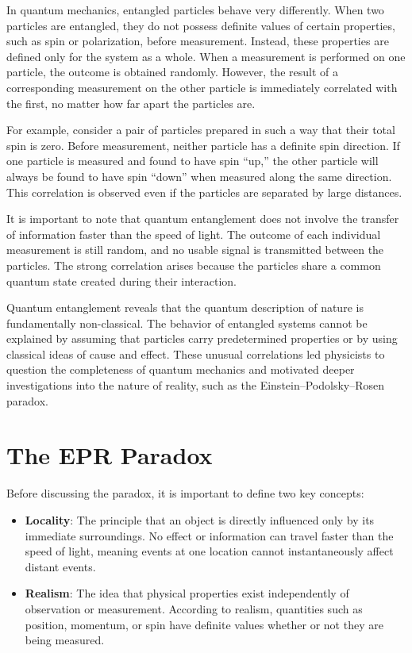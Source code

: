 \documentclass[14pt,a4paper]{extarticle}
\begin{document}
In quantum mechanics, entangled particles behave very differently. When two particles are entangled, they do not possess definite values of certain properties, such as spin or polarization, before measurement. Instead, these properties are defined only for the system as a whole. When a measurement is performed on one particle, the outcome is obtained randomly. However, the result of a corresponding measurement on the other particle is immediately correlated with the first, no matter how far apart the particles are.

For example, consider a pair of particles prepared in such a way that their total spin is zero. Before measurement, neither particle has a definite spin direction. If one particle is measured and found to have spin “up,” the other particle will always be found to have spin “down” when measured along the same direction. This correlation is observed even if the particles are separated by large distances.

It is important to note that quantum entanglement does not involve the transfer of information faster than the speed of light. The outcome of each individual measurement is still random, and no usable signal is transmitted between the particles. The strong correlation arises because the particles share a common quantum state created during their interaction.

Quantum entanglement reveals that the quantum description of nature is fundamentally non-classical. The behavior of entangled systems cannot be explained by assuming that particles carry predetermined properties or by using classical ideas of cause and effect. These unusual correlations led physicists to question the completeness of quantum mechanics and motivated deeper investigations into the nature of reality, such as the Einstein–Podolsky–Rosen paradox.

\section{The EPR Paradox}
Before discussing the paradox, it is important to define two key concepts:
\begin{itemize}
\item \textbf{Locality}: The principle that an object is directly influenced only by its immediate surroundings. No effect or information can travel faster than the speed of light, meaning events at one location cannot instantaneously affect distant events.
\item \textbf{Realism}: The idea that physical properties exist independently of observation or measurement. According to realism, quantities such as position, momentum, or spin have definite values whether or not they are being measured.
\end{itemize}
\end{document}
